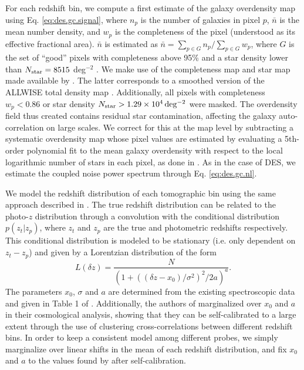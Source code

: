 \documentclass[a4paper,11pt]{article}
\newcommand{\des}{DES\xspace}
\begin{document}
      For each redshift bin, we compute a first estimate of the galaxy overdensity map using Eq. \ref{eq:des.gc.signal}, where $n_p$ is the number of galaxies in pixel $p$, $\bar{n}$ is the mean number density, and $w_p$ is the completeness of the pixel (understood as its effective fractional area). $\bar{n}$ is estimated as $\bar{n}=\sum_{p\in G}n_p/\sum_{p\in G}w_p$, where $G$ is the set of ``good'' pixels with completeness above 95\% and a star density lower than $N_{\rm star} = 8515$ deg$^{-2}$ \citep{2010.00466}. We make use of the completeness map and star map made available by \cite{2010.00466}. The latter corresponds to a smoothed version of the ALLWISE total density map \citep{1805.11525}. Additionally, all pixels with completeness $w_p < 0.86$ or star density $N_{\rm star} > \unit[1.29 \times 10^4]{deg^{-2}}$ were masked. The overdensity field thus created contains residual star contamination, affecting the galaxy auto-correlation on large scales. We correct for this at the map level by subtracting a systematic overdensity map whose pixel values are estimated by evaluating a 5th-order polynomial fit to the mean galaxy overdensity with respect to the local logarithmic number of stars in each pixel, as done in \cite{2010.00466}. As in the case of \des, we estimate the coupled noise power spectrum through Eq. \ref{eq:des.gc.nl}.

      We model the redshift distribution of each tomographic bin using the same approach described in \cite{2010.00466}. The true redshift distribution can be related to the photo-$z$ distribution through a convolution with the conditional distribution $p(z_t|z_p)$, where $z_t$ and $z_p$ are the true and photometric redshifts respectively. This conditional distribution is modeled to be stationary (i.e. only dependent on $z_t-z_p$) and given by a Lorentzian distribution of the form
      \begin{equation} \label{eq:Lorentzian}
        L(\delta z) = \frac{N}{(1 + ((\delta z - x_0) / \sigma^2)^2 / 2a)^a}.
      \end{equation}
      The parameters $x_0$, $\sigma$ and $a$ are determined from the existing spectroscopic data and given in Table 1 of \cite{2010.00466}. Additionally, the authors of \cite{2010.00466} marginalized over $x_0$ and $a$ in their cosmological analysis, showing that they can be self-calibrated to a large extent through the use of clustering cross-correlations between different redshift bins. In order to keep a consistent model among different probes, we simply marginalize over linear shifts in the mean of each redshift distribution, and fix $x_0$ and $a$ to the values found by \cite{2010.00466} after self-calibration.
\end{document}

